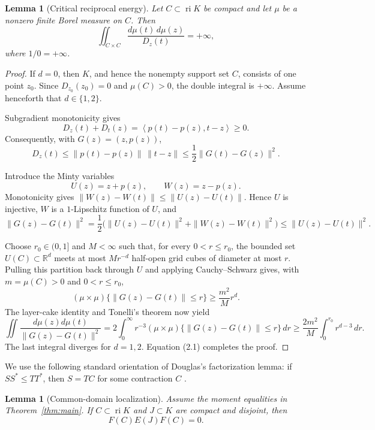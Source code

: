 \documentclass[11pt,a4paper]{amsart}
\newtheorem{lemma}[theorem]{Lemma}
\theoremstyle{remark}
\newcommand{\ri}{\operatorname{ri}}
\newcommand{\inner}[2]{\left\langle #1,#2\right\rangle}
\begin{document}
\begin{lemma}[Critical reciprocal energy]\label{lem:energy}
Let \(C\subset\ri K\) be compact and let \(\mu\) be a nonzero finite Borel
measure on \(C\).  Then
\[
 \iint_{C\times C}\frac{d\mu(t)\,d\mu(z)}{D_z(t)}=+\infty,
\]
where \(1/0=+\infty\).
\end{lemma}

\begin{proof}
If \(d=0\), then \(K\), and hence the nonempty support set \(C\), consists
of one point \(z_0\).  Since \(D_{z_0}(z_0)=0\) and \(\mu(C)>0\), the
double integral is \(+\infty\).  Assume henceforth that
\(d\in\{1,2\}\).

Subgradient monotonicity gives
\[
 D_z(t)+D_t(z)=\inner{p(t)-p(z)}{t-z}\geq0.
\]
Consequently, with \(G(z)=(z,p(z))\),
\[
 D_z(t)\leq\|p(t)-p(z)\|\,\|t-z\|
 \leq\frac12\|G(t)-G(z)\|^2.                 \tag{2.1}
\]

Introduce the Minty variables
\[
 U(z)=z+p(z),\qquad W(z)=z-p(z).
\]
Monotonicity gives
\(\|W(z)-W(t)\|\leq\|U(z)-U(t)\|\).  Hence \(U\) is injective, \(W\) is a
\(1\)-Lipschitz function of \(U\), and
\[
 \|G(z)-G(t)\|^2
 =\frac12\bigl(\|U(z)-U(t)\|^2+\|W(z)-W(t)\|^2\bigr)
 \leq\|U(z)-U(t)\|^2.                       \tag{2.2}
\]

Choose \(r_0\in(0,1]\) and \(M<\infty\) such that, for every
\(0<r\leq r_0\), the bounded set \(U(C)\subset\mathbb R^d\) meets at most
\(Mr^{-d}\) half-open grid cubes of diameter at most \(r\).  Pulling this
partition back through \(U\) and applying Cauchy--Schwarz gives, with
\(m=\mu(C)>0\) and \(0<r\leq r_0\),
\[
 (\mu\times\mu)\{\|G(z)-G(t)\|\leq r\}
 \geq \frac{m^2}{M}r^d.                     \tag{2.3}
\]
The layer-cake identity and Tonelli's theorem now yield
\[
 \iint\frac{d\mu(z)d\mu(t)}{\|G(z)-G(t)\|^2}
 =2\int_0^\infty r^{-3}
   (\mu\times\mu)\{\|G(z)-G(t)\|\leq r\}\,dr
 \geq\frac{2m^2}{M}\int_0^{r_0}r^{d-3}\,dr.
\]
The last integral diverges for \(d=1,2\).  Equation (2.1) completes the
proof.
\end{proof}

We use the following standard orientation of Douglas's factorization lemma:
if \(SS^*\leq TT^*\), then \(S=TC\) for some contraction \(C\)
\cite{Douglas}.

\begin{lemma}[Common-domain localization]\label{lem:localization}
Assume the moment equalities in Theorem~\ref{thm:main}.  If
\(C\subset\ri K\) and \(J\subset K\) are compact and disjoint, then
\[
 F(C)E(J)F(C)=0.
\]
\end{lemma}
\end{document}
